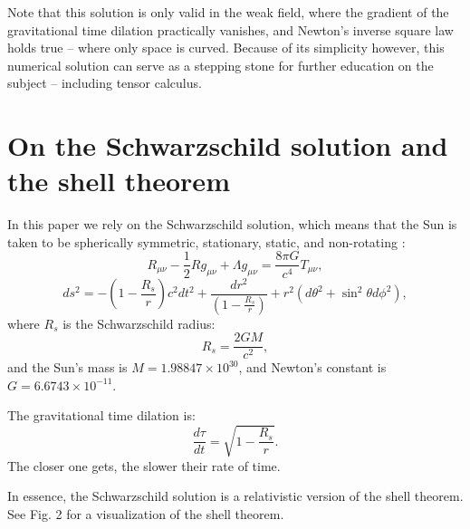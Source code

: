 \documentclass[12pt]{article}
\begin{document}
Note that this solution is only valid in the weak field, where the gradient of the gravitational time dilation practically vanishes, and Newton's inverse square law holds true -- where only space is curved. 
Because of its simplicity however, this numerical solution can serve as a stepping stone for further education on the subject -- including tensor calculus.







\section{On the Schwarzschild solution and the shell theorem}

In this paper we rely on the Schwarzschild solution, which means that the Sun is taken to be spherically symmetric, stationary, static, and non-rotating \cite{einstein, misner, schutz, mcmahon}:
\begin{equation}
\label{efe}
R_{\mu\nu} - \frac{1}{2} R g_{\mu\nu} + \Lambda g_{\mu\nu} = \frac{8\pi G}{c^4} T_{\mu\nu},
\end{equation}
\begin{equation}
\label{schwarzschild_line_element}
ds^2 = -\left( 1 - \frac{R_{s}}{r} \right) c^2 dt^2 + \frac{dr^2}{\left( 1 - \frac{R_{s}}{r} \right)} + r^2 (d\theta^2 + \sin^2 \theta d\phi^2),
\end{equation}
where $R_{s}$ is the Schwarzschild radius:
\begin{equation}
\label{schwarzschild_radius}
R_{s} = \frac{2GM}{c^2},
\end{equation}
and the Sun's mass is $M = 1.98847 \times 10^{30}$, and Newton's constant is $G = 6.6743 \times 10^{-11}$.

The gravitational time dilation is:
\begin{equation}
\label{eq_intro_gravitational}
\frac{d\tau}{dt} = \sqrt{1 - \frac{R_s}{r}}.
\end{equation}
The closer one gets, the slower their rate of time.

In essence, the Schwarzschild solution is a relativistic version of the shell theorem.
See Fig. 2 for a visualization of the shell theorem.
\end{document}
